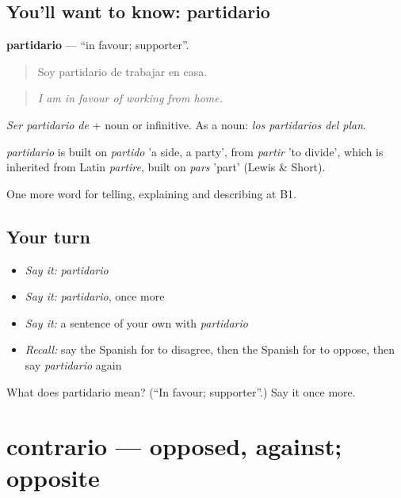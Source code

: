 \subsection*{You'll want to know: partidario}
\textbf{partidario} — \textquotedblleft{}in favour; supporter\textquotedblright{}.

\begin{quote}
Soy partidario de trabajar en casa.
\end{quote}

\begin{quote}
\emph{I am in favour of working from home.}
\end{quote}

\emph{Ser partidario de} + noun or infinitive. As a noun: \emph{los partidarios del plan}.

\begin{cousinweb}
\emph{partidario} is built on \emph{partido} 'a side, a party', from \emph{partir} 'to divide', which is inherited from Latin \emph{partire}, built on \emph{pars} 'part' (Lewis \& Short).
\end{cousinweb}

\begin{grammarlens}[title={What you've built}]
One more word for telling, explaining and describing at B1.
\end{grammarlens}

\subsection*{Your turn}
\begin{itemize}
\raggedright
  \item \emph{Say it:} \emph{partidario}
  \item \emph{Say it:} \emph{partidario}, once more
  \item \emph{Say it:} a sentence of your own with \emph{partidario}
  \item \emph{Recall:} say the Spanish for to disagree, then the Spanish for to oppose, then say \emph{partidario} again
\end{itemize}

\begin{tcolorbox}[breakable,colback=teal!4,colframe=teal!35!black,title={Before you move on}]
What does partidario mean? (\textquotedblleft{}In favour; supporter\textquotedblright{}.) Say it once more.
\end{tcolorbox}
\section[contrario]{contrario — opposed, against; opposite}

